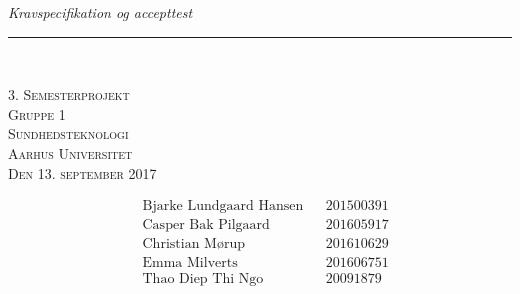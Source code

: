 \thispagestyle{empty}
\begin{flushright}
\vspace{3cm}

\phantom{hul}

\phantom{hul}

\phantom{hul}

\textsl{\Huge Kravspecifikation og accepttest} \\ \vspace{1cm}

\rule{13cm}{3mm} \\ \vspace{1.5cm}
\vspace{1cm}

\vspace{2cm} 
\textsc{\Large 3. Semesterprojekt \\
Gruppe 1 \\
Sundhedsteknologi \\
Aarhus Universitet \\
Den 13. september 2017 \\
}
\end{flushright}

\vspace*{\fill}

\begin{align*}
&\text{Bjarke Lundgaard Hansen} &&\text{201500391}\\
&\text{Casper Bak Pilgaard} &&\text{201605917}\\
&\text{Christian Mørup} &&\text{201610629}\\
&\text{Emma Milverts} &&\text{201606751}\\
&\text{Thao Diep Thi Ngo} &&\text{20091879}\\
\end{align*}

